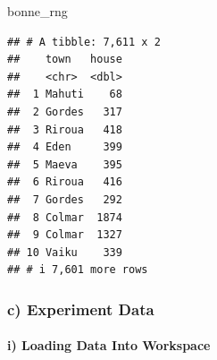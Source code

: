 \documentclass[
]{article}
\newenvironment{Shaded}{\begin{snugshade}}{\end{snugshade}}
\newcommand{\CommentTok}[1]{\textcolor[rgb]{0.56,0.35,0.01}{\textit{#1}}}
\newcommand{\FunctionTok}[1]{\textcolor[rgb]{0.13,0.29,0.53}{\textbf{#1}}}
\newcommand{\NormalTok}[1]{#1}
\newcommand{\OtherTok}[1]{\textcolor[rgb]{0.56,0.35,0.01}{#1}}
\newcommand{\SpecialCharTok}[1]{\textcolor[rgb]{0.81,0.36,0.00}{\textbf{#1}}}
\begin{document}
\begin{Shaded}
\begin{Highlighting}[]
\NormalTok{bonne\_rng}
\end{Highlighting}
\end{Shaded}

\begin{verbatim}
## # A tibble: 7,611 x 2
##    town   house
##    <chr>  <dbl>
##  1 Mahuti    68
##  2 Gordes   317
##  3 Riroua   418
##  4 Eden     399
##  5 Maeva    395
##  6 Riroua   416
##  7 Gordes   292
##  8 Colmar  1874
##  9 Colmar  1327
## 10 Vaiku    339
## # i 7,601 more rows
\end{verbatim}

\subsubsection{c) Experiment Data}\label{c-experiment-data}

\paragraph{i) Loading Data Into
Workspace}\label{i-loading-data-into-workspace}

\begin{Shaded}
\end{Shaded}
\end{document}
